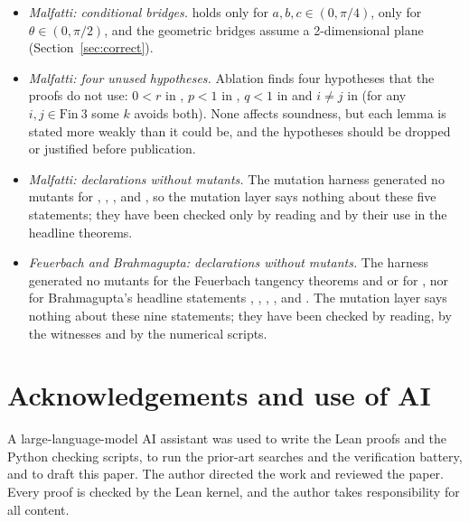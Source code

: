 \documentclass[11pt]{article}
\theoremstyle{definition}
\theoremstyle{remark}
\begin{document}
\begin{itemize}
proved. We do not prove that each circle lies inside the triangle, only that its tangency points
lie on the side segments and its centre in the interior half-planes.
\item \emph{Malfatti: conditional bridges.}  holds only for
$a,b,c\in(0,\pi/4)$,  only for $\theta\in(0,\pi/2)$, and the geometric
bridges assume a 2-dimensional plane (Section~\ref{sec:correct}).
\item \emph{Malfatti: four unused hypotheses.} Ablation finds four hypotheses that the proofs do not
use: $0<r$ in , $p<1$ in , $q<1$ in
 and $i\ne j$ in  (for any $i,j\in\mathrm{Fin}\ 3$
some $k$ avoids both). None affects soundness, but each lemma is stated more weakly than it could
be, and the hypotheses should be dropped or justified before publication.
\item \emph{Malfatti: declarations without mutants.} The mutation harness generated no mutants
for , ,
,  and
, so the mutation layer says nothing about these five statements; they
have been checked only by reading and by their use in the headline theorems.
\item \emph{Feuerbach and Brahmagupta: declarations without mutants.} The harness generated no
mutants for the Feuerbach tangency theorems 
and  or for
, nor for Brahmagupta's headline statements
, , ,
,  and
. The mutation layer says nothing about these nine
statements; they have been checked by reading, by the witnesses and by the numerical scripts.
\end{itemize}

\section*{Acknowledgements and use of AI}
A large-language-model AI assistant was used to write the Lean proofs and the Python checking
scripts, to run the prior-art searches and the verification battery, and to draft this paper. The
author directed the work and reviewed the paper. Every proof is checked by the Lean kernel, and
the author takes responsibility for all content.
\end{document}
